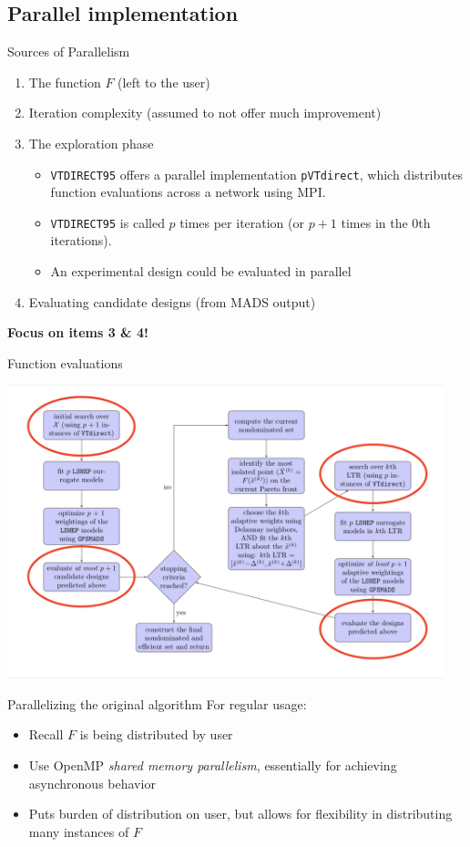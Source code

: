 \documentclass[xcolor=dvipsnames]{beamer}
\begin{document}
\subsection{Parallel implementation}
\begin{frame}{Sources of Parallelism}
\begin{enumerate}
\item The function $F$ (left to the user)
\item Iteration complexity (assumed to not offer much improvement)
\item The exploration phase
\begin{itemize}
\item
{\tt VTDIRECT95} offers a parallel implementation {\tt pVTdirect}, which distributes function evaluations across a network using MPI.
\item
{\tt VTDIRECT95} is called $p$ times per iteration (or $p+1$ times in the $0$th
iterations).
\item An experimental design could be evaluated in parallel
\end{itemize}
\item Evaluating candidate designs (from MADS output)
\end{enumerate}
\medskip
\pause
{\bf Focus on items 3 \& 4!}
\end{frame}
\begin{frame}{Function evaluations}
\begin{center}
\includegraphics[width=0.95\textwidth]{eval-chart.png}
\end{center}
\end{frame}
\begin{frame}{Parallelizing the original algorithm}
For regular usage:
\begin{itemize}
\item Recall $F$ is being distributed by user
\item Use OpenMP {\it shared memory parallelism}, essentially for achieving
asynchronous behavior
\item Puts burden of distribution on user, but allows for
flexibility in distributing many instances of $F$
\end{itemize}
\end{frame}
\end{document}

